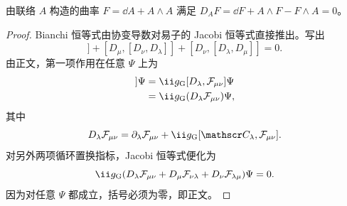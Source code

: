 \begin{theorem}
由联络 $A$ 构造的曲率 $F=\dd A+A\wedge A$ 满足 $D_AF=\dd F+A\wedge F-F\wedge A=0$。
\end{theorem}
\begin{proof}
Bianchi 恒等式由协变导数对易子的 Jacobi 恒等式直接推出。写出
\begin{equation*}
 [D_\lambda,[D_\mu,D_\nu]]
 +[D_\mu,[D_\nu,D_\lambda]]
 +[D_\nu,[D_\lambda,D_\mu]]=0.
\end{equation*}
由正文，第一项作用在任意 $\Psi$ 上为
\begin{align*}
 [D_\lambda,[D_\mu,D_\nu]]\Psi
 &=\ii g_{\rm G}[D_\lambda,\mathcal F_{\mu\nu}]\Psi\\
 &=\ii g_{\rm G}(D_\lambda\mathcal F_{\mu\nu})\Psi,
\end{align*}
其中
\begin{equation*}
 D_\lambda\mathcal F_{\mu\nu}
 =\partial_\lambda\mathcal F_{\mu\nu}
 +\ii g_{\rm G}[\mathscr C_\lambda,\mathcal F_{\mu\nu}].
\end{equation*}
对另外两项循环置换指标，Jacobi 恒等式便化为
\begin{equation*}
 \ii g_{\rm G}
 (D_\lambda\mathcal F_{\mu\nu}
 +D_\mu\mathcal F_{\nu\lambda}
 +D_\nu\mathcal F_{\lambda\mu})\Psi=0.
\end{equation*}
因为对任意 $\Psi$ 都成立，括号必须为零，即正文。
\end{proof}

